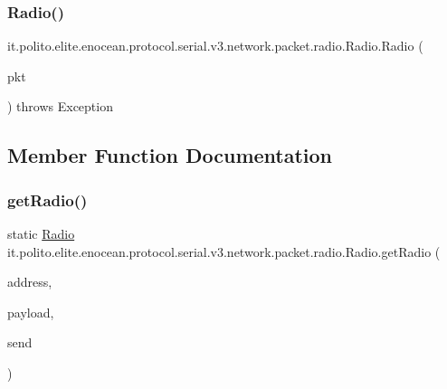 \subsubsection{\texorpdfstring{Radio()}{Radio()}\hspace{0.1cm}{\footnotesize\ttfamily [3/3]}}
{\footnotesize\ttfamily it.\+polito.\+elite.\+enocean.\+protocol.\+serial.\+v3.\+network.\+packet.\+radio.\+Radio.\+Radio (\begin{DoxyParamCaption}\item[{\hyperlink{classit_1_1polito_1_1elite_1_1enocean_1_1protocol_1_1serial_1_1v3_1_1network_1_1packet_1_1_e_s_p3_packet}{E\+S\+P3\+Packet}}]{pkt }\end{DoxyParamCaption}) throws Exception}



\subsection{Member Function Documentation}
\hypertarget{classit_1_1polito_1_1elite_1_1enocean_1_1protocol_1_1serial_1_1v3_1_1network_1_1packet_1_1radio_1_1_radio_a037dae1b2747a7599a491b265eb0f540}{}\label{classit_1_1polito_1_1elite_1_1enocean_1_1protocol_1_1serial_1_1v3_1_1network_1_1packet_1_1radio_1_1_radio_a037dae1b2747a7599a491b265eb0f540} 
\subsubsection{\texorpdfstring{get\+Radio()}{getRadio()}}
{\footnotesize\ttfamily static \hyperlink{classit_1_1polito_1_1elite_1_1enocean_1_1protocol_1_1serial_1_1v3_1_1network_1_1packet_1_1radio_1_1_radio}{Radio} it.\+polito.\+elite.\+enocean.\+protocol.\+serial.\+v3.\+network.\+packet.\+radio.\+Radio.\+get\+Radio (\begin{DoxyParamCaption}\item[{byte \mbox{[}$\,$\mbox{]}}]{address,  }\item[{byte \mbox{[}$\,$\mbox{]}}]{payload,  }\item[{boolean}]{send }\end{DoxyParamCaption})\hspace{0.3cm}{\ttfamily [static]}}

